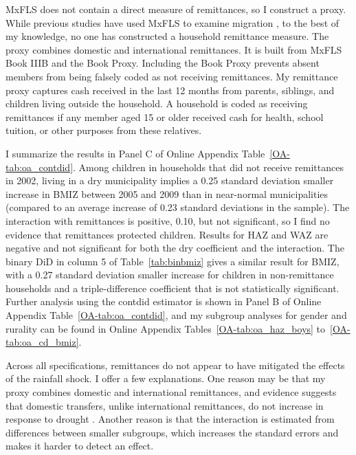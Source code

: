 \documentclass[12pt]{article}
\begin{document}
MxFLS does not contain a direct measure of remittances, so I construct a proxy. While previous studies have used MxFLS to examine migration \parencite{creightonMigrantNetworksPathways2011,damonChildhoodObesityMexico2014}, to the best of my knowledge, no one has constructed a household remittance measure. The proxy combines domestic and international remittances. It is built from MxFLS Book IIIB and the Book Proxy. Including the Book Proxy prevents absent members from being falsely coded as not receiving remittances. My remittance proxy captures cash received in the last 12 months from parents, siblings, and children living outside the household. A household is coded as receiving remittances if any member aged 15 or older received cash for health, school tuition, or other purposes from these relatives.

I summarize the results in Panel C of Online Appendix Table~\ref{OA-tab:oa_contdid}. Among children in households that did not receive remittances in 2002, living in a dry municipality implies a 0.25 standard deviation smaller increase in BMIZ between 2005 and 2009 than in near-normal municipalities (compared to an average increase of 0.23 standard deviations in the sample). The interaction with remittances is positive, 0.10, but not significant, so I find no evidence that remittances protected children. Results for HAZ and WAZ are negative and not significant for both the dry coefficient and the interaction. The binary DiD in column 5 of Table~\ref{tab:binbmiz} gives a similar result for BMIZ, with a 0.27 standard deviation smaller increase for children in non-remittance households and a triple-difference coefficient that is not statistically significant. Further analysis using the contdid estimator is shown in Panel B of Online Appendix Table~\ref{OA-tab:oa_contdid}, and my subgroup analyses for gender and rurality can be found in Online Appendix Tables~\ref{OA-tab:oa_haz_boys} to~\ref{OA-tab:oa_cd_bmiz}.

Across all specifications, remittances do not appear to have mitigated the effects of the rainfall shock. I offer a few explanations. One reason may be that my proxy combines domestic and international remittances, and evidence suggests that domestic transfers, unlike international remittances, do not increase in response to drought \parencite{smithClimateChangeViolence2025}. Another reason is that the interaction is estimated from differences between smaller subgroups, which increases the standard errors and makes it harder to detect an effect.
\end{document}
